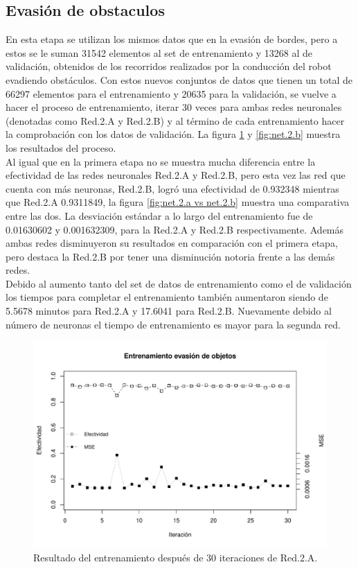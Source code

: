 \documentclass{iccmemoria}
\begin{document}
\subsection{Evasión de obstaculos}

En esta etapa se utilizan los mismos datos que en la evasión de bordes, pero a estos se le suman 31542 elementos al set de entrenamiento y 13268 al de validación, obtenidos de los recorridos realizados por la conducción del robot evadiendo obstáculos. Con estos nuevos conjuntos de datos que tienen un total de 66297 elementos para el entrenamiento y 20635 para la validación, se vuelve a hacer el proceso de entrenamiento, iterar 30 veces para ambas redes neuronales (denotadas como Red.2.A y Red.2.B) y al término de cada entrenamiento hacer la comprobación con los datos de validación. La figura \ref{fig:net.2.a} y \ref{fig:net.2.b} muestra los resultados del proceso.\\

Al igual que en la primera etapa no se muestra mucha diferencia entre la efectividad de las redes neuronales Red.2.A y Red.2.B, pero esta vez las red que cuenta con más neuronas, Red.2.B, logró una efectividad de 0.932348 mientras que Red.2.A 0.9311849, la figura \ref{fig:net.2.a vs net.2.b} muestra una comparativa entre las dos. La desviación estándar a lo largo del entrenamiento fue de 0.01630602 y 0.001632309, para la Red.2.A y Red.2.B respectivamente. Además ambas redes disminuyeron su resultados en comparación con el primera etapa, pero destaca la Red.2.B por tener una disminución notoria frente a las demás redes.\\

Debido al aumento tanto del set de datos de entrenamiento como el de validación los tiempos para completar el entrenamiento también aumentaron siendo de 5.5678 minutos para Red.2.A y 17.6041 para Red.2.B. Nuevamente debido al número de neuronas el tiempo de entrenamiento es mayor para la segunda red.\\

\begin{figure}
  \centering
  \includegraphics[width = 450pt]{images/plot_net_2_a.pdf}
  \caption[Entrenamiento segunda etapa Red.2.A.]{Resultado del entrenamiento después de 30 iteraciones de Red.2.A.}
  \label{fig:net.2.a}
\end{figure}
\end{document}
